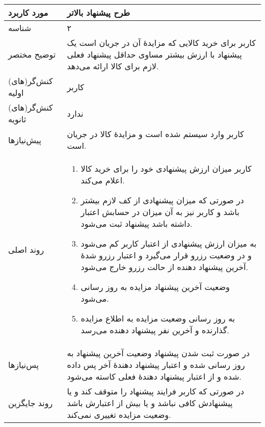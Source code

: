 \documentclass{article}
\begin{document}
\begin{center}
\bgroup
\def\arraystretch{1.5}
\begin{tabular} {|p{}|p{}|}
\hline
 مورد کاربرد & 
طرح پیشنهاد بالاتر
\\ \hline
 شناسه &
۲
\\ \hline
توضیح مختصر &
کاربر برای خرید کالایی که مزایدهٔ آن در جریان است یک پیشنهاد با ارزش بیشتر مساوی حداقل پیشنهاد فعلی لازم برای کالا ارائه می‌دهد.
\\ \hline
کنش‌گر(های) اولیه &
کاربر
\\ \hline
کنش‌گر(های) ثانویه &
ندارد
\\ \hline
پیش‌نیازها &
کاربر وارد سیستم شده است و مزایدهٔ کالا در جریان است.
\\ \hline
روند اصلی &
\begin{enumerate}[nosep,topsep=0cm]
\item
کاربر میزان ارزش پیشنهادی خود را برای خرید کالا اعلام می‌کند.
\item
در صورتی که میزان پیشنهادی از کف لازم بیشتر باشد و کاربر نیز به آن میزان در حسابش اعتبار داشته باشد پیشنهاد ثبت می‌شود.
\item
به میزان ارزش پیشنهادی از اعتبار کاربر کم می‌شود و در وضعیت رزرو قرار می‌گیرد و اعتبار رزرو شدهٔ آخرین پیشنهاد دهنده از حالت رزرو خارج می‌شود.
\item
وضعیت آخرین پیشنهاد مزایده به روز رسانی می‌شود.
\item
به روز رسانی وضعیت مزایده به اطلاع مزایده گذارنده و آخرین نفر پیشنهاد دهنده می‌رسد.
\end{enumerate}
\\ \hline
پس‌نیازها &
در صورت ثبت شدن پیشنهاد وضعیت آخرین پیشنهاد به روز رسانی شده و اعتبار پیشنهاد دهندهٔ آخر پس داده شده و از اعتبار پیشنهاد دهندهٔ فعلی کاسته می‌شود.
\\ \hline
روند جایگزین &
در صورتی که کاربر فرایند پیشنهاد را متوقف کند و یا پیشنهادش کافی نباشد و یا بیش از اعتبارش باشد وضعیت مزایده تغییری نمی‌کند.
\\ \hline
\end{tabular}
\egroup
\end{center}

\newpage
\end{document}
